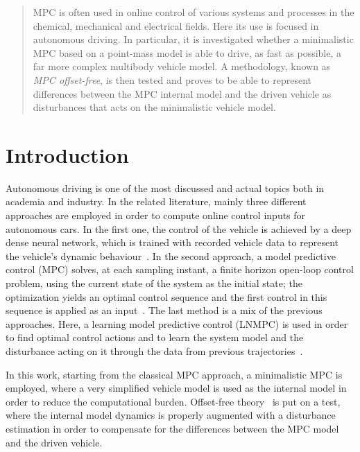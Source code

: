 \documentclass[conference]{IEEEtran} %
\begin{document}

\begin{abstract}
	MPC is often used in online control of various systems and processes in the chemical, mechanical and electrical fields.
	Here its use is focused in autonomous driving.
	In particular, it is investigated whether a minimalistic MPC based on a point-mass model is able to drive, as fast as possible, a far more complex multibody vehicle model.
	A methodology, known as \emph{MPC offset-free}, is then tested and proves to be able to represent differences between the MPC internal model and the driven vehicle as disturbances that acts on the minimalistic vehicle model.
\end{abstract}

\IEEEpeerreviewmaketitle

\section{Introduction}
Autonomous driving is one of the most discussed and actual topics both in academia and industry.
In the related literature, mainly three different approaches are employed in order to compute online control inputs for autonomous cars.
In the first one, the control of the vehicle is achieved by a deep dense neural network, which is trained with recorded vehicle data to represent the vehicle's dynamic behaviour~\cite{Hermansdorfer2020, Zhu2018, Navarro2018}. In the second approach, a model predictive control (MPC) solves, at each sampling instant, a finite horizon open-loop control problem, using the current state of the system as the initial state; the optimization yields an optimal control sequence and the first control in this sequence is applied as an input~\cite{Liniger2015, Novi2019, Verschueren2014}. The last method is a mix of the previous approaches. Here, a learning model predictive control (LNMPC) is used in order to find optimal control actions and
to learn the system model and the disturbance acting on it through the data from previous trajectories~\cite{Rosolia2016, Brunner2017, Limon2017}.

In this work, starting from the classical MPC approach, a minimalistic MPC is employed, where a very simplified vehicle model is used as the internal model in order to reduce the computational burden.
Offset-free theory~\cite{Pannocchia2015} is put on a test, where the internal model dynamics is properly augmented with a disturbance estimation in order to compensate for the differences between the MPC model and the driven vehicle.
\end{document}
